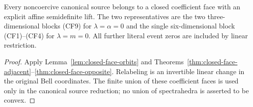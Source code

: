 \begin{corollary}
\label{cor:all-closed-faces}
Every noncoercive canonical source belongs to a closed coefficient
face with an explicit affine semidefinite lift. The two representatives
are the two three-dimensional blocks (CF9) for $\lambda=\alpha=0$
and the single six-dimensional block (CF1)--(CF4) for $\lambda=m=0$.
All further literal event zeros are included by linear restriction.
\end{corollary}
\begin{proof}
Apply Lemma~\ref{lem:closed-face-orbits} and
Theorems~\ref{thm:closed-face-adjacent}--\ref{thm:closed-face-opposite}.
Relabeling is an invertible
linear change in the original Bell coordinates. The finite union of
these coefficient faces is used only in the canonical source
reduction; no union of spectrahedra is asserted to be convex.
\end{proof}
